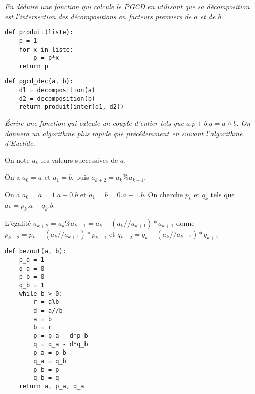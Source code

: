 \begin{Exercise}[title = PGCD avec les décompositions]
\it En déduire une fonction  qui calcule le PGCD en utilisant que sa décomposition est l'intersection des décompositions en facteurs premiers de $a$ et de $b$.
\end{Exercise}
\begin{Answer}
\begin{lstlisting}
def produit(liste):
    p = 1
    for x in liste:
        p = p*x
    return p
\end{lstlisting}

\begin{lstlisting}
def pgcd_dec(a, b):
    d1 = decomposition(a)
    d2 = decomposition(b)
    return produit(inter(d1, d2))
\end{lstlisting}
\end{Answer}
\begin{Exercise}[title =Coefficients de Bezout bis]
\it Écrire une fonction  qui calcule un couple d'entier  tels que $a.p + b.q = a\wedge b$. On donnera un algorithme plus rapide que précédemment en suivant l'algorithme d'Euclide.
\end{Exercise}
\begin{Answer}
On note $a_k$ les valeurs successives de $a$.

On a $a_0 = a$ et $a_1 = b$, puis $a_{k+2} = a_k \% a_{k+1}$.

On a $a_0 = a = 1.a + 0.b$ et $a_1 = b = 0.a + 1.b$. On cherche $p_k$ et $q_k$ tels que $a_k = p_k.a + q_k.b$. 

L'égalité $a_{k+2} = a_k \% a_{k+1} = a_k - (a_k//a_{k+1})*a_{k+1}$ donne $p_{k+2} = p_k - (a_k//a_{k+1})*p_{k+1}$ et $q_{k+2} = q_k - (a_k//a_{k+1})*q_{k+1}$
\begin{lstlisting}
def bezout(a, b):
    p_a = 1
    q_a = 0
    p_b = 0
    q_b = 1
    while b > 0:
        r = a%b
        d = a//b
        a = b
        b = r
        p = p_a - d*p_b
        q = q_a - d*q_b
        p_a = p_b
        q_a = q_b
        p_b = p
        q_b = q
    return a, p_a, q_a
\end{lstlisting}
\end{Answer}


